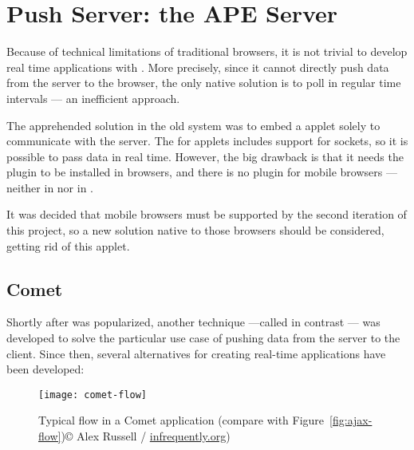 \section{Push Server: the APE Server} %
\label{sec:ape}

Because of technical limitations of traditional browsers, it is not trivial to develop real time applications with .
More precisely, since it cannot directly push data from the server to the browser, the only native solution is to poll in regular time intervals --- an inefficient approach.

The apprehended solution in the old system was to embed a  applet solely to communicate with the server.
The   for applets includes support for sockets, so it is possible to pass data in real time.
However, the big drawback is that it needs the  plugin to be installed in browsers, and there is no plugin for mobile browsers --- neither in  nor in .

It was decided that mobile browsers must be supported by the second iteration of this project, so a new solution native to those browsers should be considered, getting rid of this  applet.

\subsection{Comet} %
\label{sub:comet}

Shortly after  was popularized, another technique ---called in contrast --- was developed to solve the particular use case of pushing data from the server to the client.
Since then, several alternatives for creating real-time applications have been developed:

\begin{figure}[htbp]
  \centering
    \texttt{[image: comet-flow]}
  \caption[Comet flow]{Typical flow in a Comet application (compare with Figure~\ref{fig:ajax-flow})\newline© Alex Russell / \url{infrequently.org})}
  \label{fig:comet-flow}
\end{figure}

